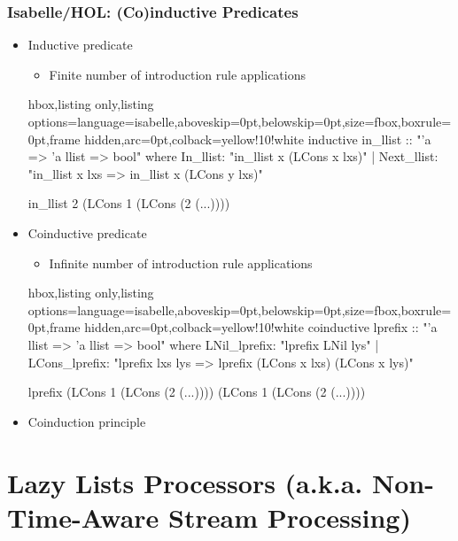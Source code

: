 \documentclass[aspectratio=169,10pt]{beamer}
\begin{document}
\begin{frame}[fragile]
  \frametitle{Isabelle/HOL: (Co)inductive Predicates}
  \begin{itemize}
    \item Inductive predicate
          \begin{itemize}
            \item Finite number of introduction rule applications
          \end{itemize}
          \vspace*{-1ex}
          \begin{tcblisting}{hbox,listing only,listing options={language=isabelle,aboveskip=0pt,belowskip=0pt},size=fbox,boxrule=0pt,frame hidden,arc=0pt,colback=yellow!10!white}
inductive in_llist :: "'a => 'a llist => bool" where
  In_llist: "in_llist x (LCons x lxs)"
| Next_llist: "in_llist x lxs => in_llist x (LCons y lxs)"

in_llist 2 (LCons 1 (LCons (2 (...))))
          \end{tcblisting}
          \vspace*{-1ex}
          \pause
    \item Coinductive predicate
          \begin{itemize}
            \item Infinite number of introduction rule applications
          \end{itemize}
          \vspace*{-1ex}
          \begin{tcblisting}{hbox,listing only,listing options={language=isabelle,aboveskip=0pt,belowskip=0pt},size=fbox,boxrule=0pt,frame hidden,arc=0pt,colback=yellow!10!white}
coinductive lprefix :: "'a llist => 'a llist => bool" where
  LNil_lprefix: "lprefix LNil lys"
| LCons_lprefix: "lprefix lxs lys => lprefix (LCons x lxs) (LCons x lys)"

lprefix (LCons 1 (LCons (2 (...)))) (LCons 1 (LCons (2 (...))))
          \end{tcblisting}
          \vspace*{-1ex}
          \pause
    \item Coinduction principle
  \end{itemize}
\end{frame}

\section{Lazy Lists Processors (a.k.a. Non-Time-Aware Stream Processing)}
\end{document}
